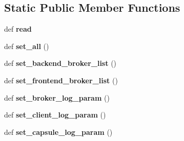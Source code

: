 \subsection*{Static Public Member Functions}
\begin{DoxyCompactItemize}
\item 
\hypertarget{classorg_1_1swallow__labs_1_1model_1_1_parser_1_1_parser_a39a23a951dbb89cc75d901a9b75f1692}{}def {\bfseries read}\label{classorg_1_1swallow__labs_1_1model_1_1_parser_1_1_parser_a39a23a951dbb89cc75d901a9b75f1692}

\item 
\hypertarget{classorg_1_1swallow__labs_1_1model_1_1_parser_1_1_parser_a8892ca992888642f1d2dfcc8568137dc}{}def {\bfseries set\+\_\+all} ()\label{classorg_1_1swallow__labs_1_1model_1_1_parser_1_1_parser_a8892ca992888642f1d2dfcc8568137dc}

\item 
\hypertarget{classorg_1_1swallow__labs_1_1model_1_1_parser_1_1_parser_ae96b9f34494fccaff606434d6bee3ae2}{}def {\bfseries set\+\_\+backend\+\_\+broker\+\_\+list} ()\label{classorg_1_1swallow__labs_1_1model_1_1_parser_1_1_parser_ae96b9f34494fccaff606434d6bee3ae2}

\item 
\hypertarget{classorg_1_1swallow__labs_1_1model_1_1_parser_1_1_parser_a9209fbc2aecbb543de2f1876ac912185}{}def {\bfseries set\+\_\+frontend\+\_\+broker\+\_\+list} ()\label{classorg_1_1swallow__labs_1_1model_1_1_parser_1_1_parser_a9209fbc2aecbb543de2f1876ac912185}

\item 
\hypertarget{classorg_1_1swallow__labs_1_1model_1_1_parser_1_1_parser_a24030f97c02a728b9bb1868d88eb3abe}{}def {\bfseries set\+\_\+broker\+\_\+log\+\_\+param} ()\label{classorg_1_1swallow__labs_1_1model_1_1_parser_1_1_parser_a24030f97c02a728b9bb1868d88eb3abe}

\item 
\hypertarget{classorg_1_1swallow__labs_1_1model_1_1_parser_1_1_parser_a2f99c9d32ba99473dfcb9ed01557d6ec}{}def {\bfseries set\+\_\+client\+\_\+log\+\_\+param} ()\label{classorg_1_1swallow__labs_1_1model_1_1_parser_1_1_parser_a2f99c9d32ba99473dfcb9ed01557d6ec}

\item 
\hypertarget{classorg_1_1swallow__labs_1_1model_1_1_parser_1_1_parser_a7b603c6a9d0f3e7ed0f09546559a7549}{}def {\bfseries set\+\_\+capsule\+\_\+log\+\_\+param} ()\label{classorg_1_1swallow__labs_1_1model_1_1_parser_1_1_parser_a7b603c6a9d0f3e7ed0f09546559a7549}


\end{DoxyCompactItemize}
